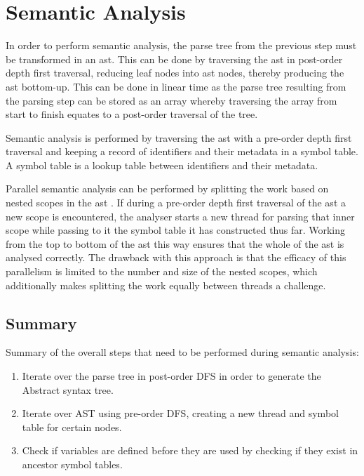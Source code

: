 \section{Semantic Analysis}

In order to perform semantic analysis, the parse tree from the previous
step must be transformed in an \gls{ast}. This can be done by traversing the
\gls{ast} in post-order depth first traversal, reducing leaf nodes into ast nodes,
thereby producing the \gls{ast} bottom-up. This can be done in linear time as
the parse tree resulting from the parsing step can be stored as an array whereby
traversing the array from start to finish equates to a post-order traversal of
the tree. 

Semantic analysis is performed by traversing the \gls{ast} with a pre-order
depth first traversal and keeping a record of  identifiers and their metadata in
a symbol table. A symbol table is a lookup table between identifiers and their
metadata.

Parallel semantic analysis can be performed by splitting the work based on
nested scopes in the \gls{ast} \citep{seshadri_investigation_1991}. If during
a pre-order depth first traversal of the \gls{ast} a new scope is encountered,
the analyser starts a new thread for parsing that inner scope while passing
to it the symbol table it has constructed thus far. Working from the top to
bottom of the \gls{ast} this way ensures that the whole of the \gls{ast} is
analysed correctly. The drawback with this approach is that the efficacy of
this parallelism is limited to the number and size of the nested scopes, which
additionally makes splitting the work equally between threads a challenge.


\subsection{Summary}
Summary of the overall steps that need to be performed during semantic
analysis:

\begin{enumerate}
	\item Iterate over the parse tree in post-order DFS in order to generate the Abstract syntax tree.
	\item Iterate over AST using pre-order DFS, creating a new thread and symbol table for certain nodes.
	\item Check if variables are defined before they are used by checking if they exist in ancestor symbol tables.
\end{enumerate}



